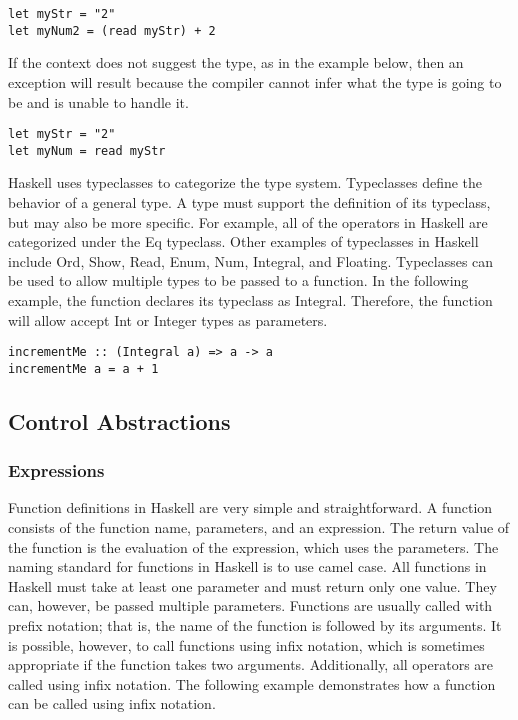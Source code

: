 \documentclass[titlepage,12pt]{article}
\begin{document}
\begin{verbatim}
let myStr = "2" 
let myNum2 = (read myStr) + 2
\end{verbatim}

If the context does not suggest the type, as in the example below, then an exception will result because the compiler cannot infer what the type is going to be and is unable to handle it. 

\begin{verbatim}
let myStr = "2" 
let myNum = read myStr
\end{verbatim}

Haskell uses typeclasses to categorize the type system. Typeclasses define the behavior of a general type. A type must support the definition of its typeclass, but may also be more specific. For example, all of the operators in Haskell are categorized under the Eq typeclass. Other examples of typeclasses in Haskell include Ord, Show, Read, Enum, Num, Integral, and Floating. Typeclasses can be used to allow multiple types to be passed to a function. In the following example, the function declares its typeclass as Integral. Therefore, the function will allow accept Int or Integer types as parameters. 

\begin{verbatim}
incrementMe :: (Integral a) => a -> a
incrementMe a = a + 1
\end{verbatim}

\subsection{Control Abstractions}
\subsubsection{Expressions}

Function definitions in Haskell are very simple and straightforward. A function consists of the function name, parameters, and an expression. The return value of the function is the evaluation of the expression, which uses the parameters. The naming standard for functions in Haskell is to use camel case. All functions in Haskell must take at least one parameter and must return only one value. They can, however, be passed multiple parameters. Functions are usually called with prefix notation; that is, the name of the function is followed by its arguments. It is possible, however, to call functions using infix notation, which is sometimes appropriate if the function takes two arguments. Additionally, all operators are called using infix notation. The following example demonstrates how a function can be called using infix notation. 
\end{document}
